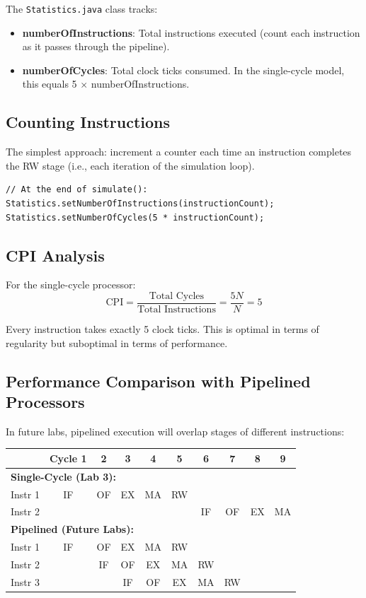 \documentclass[12pt,a4paper]{article}
\begin{document}
The \texttt{Statistics.java} class tracks:

\begin{itemize}
    \item \textbf{numberOfInstructions}: Total instructions executed (count each instruction as it passes through the pipeline).
    \item \textbf{numberOfCycles}: Total clock ticks consumed. In the single-cycle model, this equals 5 $\times$ numberOfInstructions.
\end{itemize}

\subsection{Counting Instructions}

The simplest approach: increment a counter each time an instruction completes the RW stage (i.e., each iteration of the simulation loop).

\begin{lstlisting}[style=javastyle]
// At the end of simulate():
Statistics.setNumberOfInstructions(instructionCount);
Statistics.setNumberOfCycles(5 * instructionCount);
\end{lstlisting}

\subsection{CPI Analysis}

For the single-cycle processor:
\[
\text{CPI} = \frac{\text{Total Cycles}}{\text{Total Instructions}} = \frac{5N}{N} = 5
\]

Every instruction takes exactly 5 clock ticks. This is optimal in terms of regularity but suboptimal in terms of performance.

\subsection{Performance Comparison with Pipelined Processors}

In future labs, pipelined execution will overlap stages of different instructions:

\begin{center}
\begin{tabular}{l|ccccccccc}
\toprule
& Cycle 1 & 2 & 3 & 4 & 5 & 6 & 7 & 8 & 9 \\
\midrule
\multicolumn{10}{l}{\textbf{Single-Cycle (Lab 3):}} \\
Instr 1 & IF & OF & EX & MA & RW & & & & \\
Instr 2 & & & & & & IF & OF & EX & MA \\
\midrule
\multicolumn{10}{l}{\textbf{Pipelined (Future Labs):}} \\
Instr 1 & IF & OF & EX & MA & RW & & & & \\
Instr 2 & & IF & OF & EX & MA & RW & & & \\
Instr 3 & & & IF & OF & EX & MA & RW & & \\
\bottomrule
\end{tabular}
\end{center}
\end{document}
